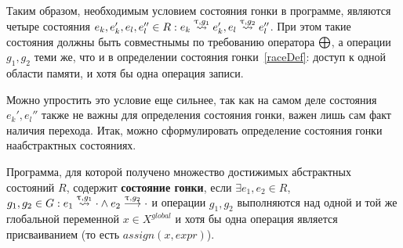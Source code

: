 Таким образом, необходимым условием состояния гонки в программе, являются четыре состояния $e_k, e_k', e_l, e_l'' \in R: e_k \stackrel{\uptau, g_1}{\leadsto} e_k', e_l \stackrel{\uptau, g_2}{\leadsto} e_l''$. 
При этом такие состояния должны быть совместнымы по требованию оператора $\mathrel{\bigoplus}$, а операции $g_1, g_2$ теми же, что и в определении состояния гонки~\ref{raceDef}: доступ к одной области памяти, и хотя бы одна операция записи.

Можно упростить это условие еще сильнее, так как на самом деле состояния $e_k', e_l''$ также не важны для определения состояния гонки, важен лишь сам факт наличия перехода.
Итак, можно сформулировать определение состояния гонки наабстрактных состояниях.

\begin{defn}
\label{raceDef_abstract}
Программа, для которой получено множество достижимых абстрактных состояний $R$, содержит \textbf{состояние гонки}, если $\exists e_1, e_2 \in R$, $g_1, g_2 \in G: e_1 \stackrel{\uptau, g_1}{\leadsto} \cdot \land e_2 \stackrel{\uptau, g_2}{\longrightarrow} \cdot$ и операции $g_1, g_2$ выполняются над одной и той же глобальной переменной $x \in X^{global}$ и хотя бы одна операция является присваиванием (то есть $assign(x, expr)$).
\end{defn}


